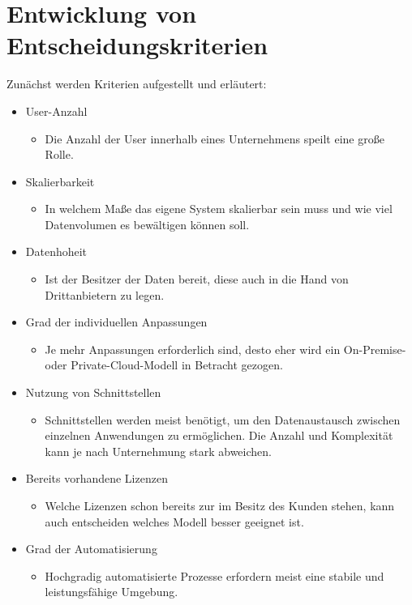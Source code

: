 \documentclass[12pt,bibtotoc]{article}
\begin{document}
			\section{Entwicklung von Entscheidungskriterien}
	Zunächst werden Kriterien aufgestellt und erläutert:
	\begin{itemize}
		\item User-Anzahl %
		\begin{itemize}
			\item Die Anzahl der User innerhalb eines Unternehmens speilt eine große Rolle.
		\end{itemize}
		\item Skalierbarkeit 
			\begin{itemize}
				\item In welchem Maße das eigene System skalierbar sein muss und wie viel Datenvolumen es bewältigen können soll.
			\end{itemize}
		\item Datenhoheit %
			\begin{itemize}
				\item Ist der Besitzer der Daten bereit, diese auch in die Hand von Drittanbietern zu legen.
			\end{itemize}
		\item Grad der individuellen Anpassungen %
			\begin{itemize}
				\item Je mehr Anpassungen erforderlich sind, desto eher wird ein On-Premise- oder Private-Cloud-Modell in Betracht gezogen.
			\end{itemize}
		\item Nutzung von Schnittstellen %
			\begin{itemize}
				\item Schnittstellen werden meist benötigt, um den Datenaustausch zwischen einzelnen Anwendungen zu ermöglichen. Die Anzahl und Komplexität kann je nach Unternehmung stark abweichen.
			\end{itemize}
		\item Bereits vorhandene Lizenzen %
			\begin{itemize}
				\item Welche Lizenzen schon bereits zur im Besitz des Kunden stehen, kann auch entscheiden welches Modell besser geeignet ist. 
			\end{itemize}
		\item Grad der Automatisierung %
			\begin{itemize}
				\item Hochgradig automatisierte Prozesse erfordern meist eine stabile und leistungsfähige Umgebung. 
			\end{itemize}
	\end{itemize}
\end{document}
